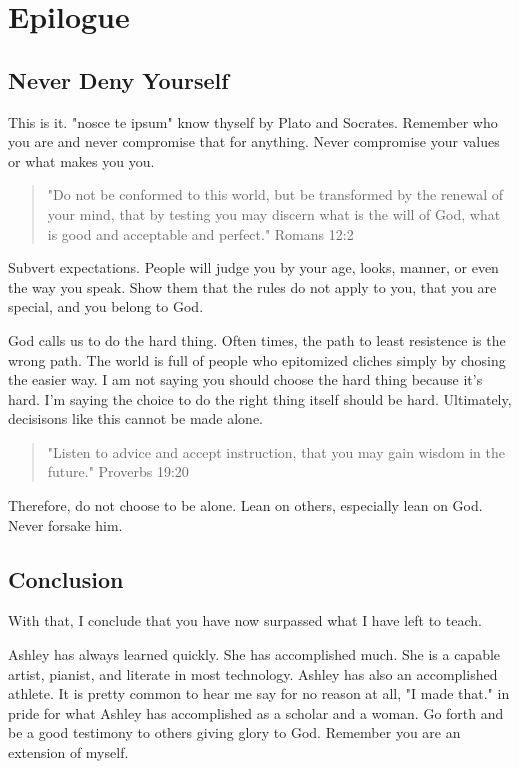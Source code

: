 \documentclass[11pt,a4paper,sans]{article}
\begin{document}
\section{Epilogue}

\subsection{Never Deny Yourself}
This is it. "nosce te ipsum" know thyself by Plato and Socrates. Remember who you
are and never compromise that for anything. Never compromise your values or what makes
you you.


    \begin{quote}
        "Do not be conformed to this world, but be transformed by the renewal of your mind, that by testing you may discern what is the will of God, what is good and acceptable and perfect." Romans 12:2
    \end{quote}

Subvert expectations. People will judge you by your age, looks, manner, or even the way you
speak. Show them that the rules do not apply to you, that you are special, and you belong to 
God.


God calls us to do the hard thing. Often times, the path to least resistence
is the wrong path. The world is full of people who epitomized cliches simply by 
chosing the easier way. I am not saying you should choose the hard thing because it's
hard. I'm saying the choice to do the right thing itself should be hard. Ultimately,
decisisons like this cannot be made alone.

\begin{quote}
    "Listen to advice and accept instruction,
that you may gain wisdom in the future." Proverbs 19:20
\end{quote}

Therefore, do not choose to be alone. Lean on others, especially lean on God. 
Never forsake him.

\subsection{Conclusion}

With that, I conclude that you have now surpassed what I have left to teach. 

Ashley has always learned quickly. She has accomplished much. She is a capable artist,
pianist, and literate in most technology. Ashley has also an accomplished athlete.
It is pretty common to hear me say for no reason at all, "I made that." in pride for 
what Ashley has accomplished as a scholar and a woman. Go forth
and be a good testimony to others giving glory to God. Remember you are an extension 
of myself.
\end{document}
